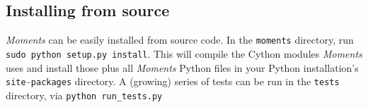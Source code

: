 \documentclass[12pt]{article}
\makeatletter
\newcommand{\py}[1]{\lstinline[breaklines=true,language=Python, showstringspaces=False]@#1@}
\makeatother
\begin{document}
\subsection{Installing from source}

\textit{Moments} can be easily installed from source code.
In the \py{moments} directory, run \py{sudo python setup.py install}.
This will compile the Cython modules \textit{Moments} uses and install those plus all \textit{Moments} Python files in your Python installation's \py{site-packages} directory.
A (growing) series of tests can be run in the \py{tests} directory, via \py{python run_tests.py}



\end{document}
